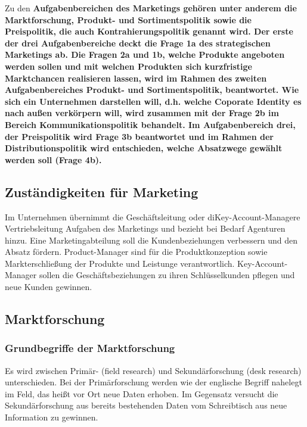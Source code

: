 Zu den \bf{Aufgabenbereichen} des Marketings gehören unter anderem die \bf{Marktforschung}, \bf{Produkt- und Sortimentspolitik} sowie die \bf{Preispolitik}, die auch Kontrahierungspolitik genannt wird. Der erste der drei Aufgabenbereiche deckt die Frage 1a des strategischen Marketings ab. Die Fragen 2a und 1b, welche Produkte angeboten werden sollen und mit welchen Produkten sich kurzfristige Marktchancen realisieren lassen, wird im Rahmen des zweiten Aufgabenbereiches \ql Produkt- und Sortimentspolitik\qr, beantwortet. Wie sich ein Unternehmen darstellen will, d.h. welche Coporate Identity es nach außen verkörpern will, wird zusammen mit der Frage 2b im Bereich \bf{Kommunikationspolitik} behandelt. Im Aufgabenbereich drei, der Preispolitik wird Frage 3b beantwortet und im Rahmen der \bf{Distributionspolitik} wird entschieden, welche Absatzwege gewählt werden soll (Frage 4b).

\subsection{Zuständigkeiten für Marketing}

Im Unternehmen übernimmt die Geschäftsleitung oder diKey-Account-Managere Vertriebsleitung Aufgaben des Marketings und bezieht bei Bedarf Agenturen hinzu. Eine Marketingabteilung soll die Kundenbeziehungen verbessern und den Absatz fördern. Product-Manager sind für die Produktkonzeption sowie Markterschließung der Produkte und Leistunge verantwortlich. Key-Account-Manager sollen die Geschäftsbeziehungen zu ihren Schlüsselkunden pflegen und neue Kunden gewinnen.

\subsection{Marktforschung}
\subsubsection{Grundbegriffe der Marktforschung}
Es wird zwischen Primär- (field research) und Sekundärforschung (desk research) unterschieden. Bei der Primärforschung werden wie der englische Begriff nahelegt im Feld, das heißt vor Ort neue Daten erhoben. Im Gegensatz versucht die Sekundärforschung aus bereits bestehenden Daten vom Schreibtisch aus neue Information zu gewinnen.

